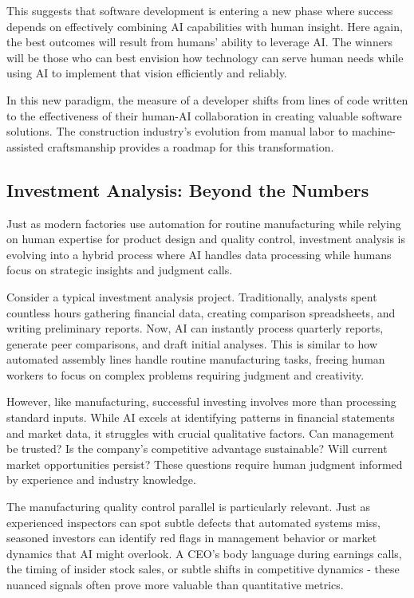\documentclass[
  Letterpaper,
]{scrbook}
\begin{document}
This suggests that software development is entering a new phase where
success depends on effectively combining AI capabilities with human
insight. Here again, the best outcomes will result from humans' ability
to leverage AI. The winners will be those who can best envision how
technology can serve human needs while using AI to implement that vision
efficiently and reliably.

In this new paradigm, the measure of a developer shifts from lines of
code written to the effectiveness of their human-AI collaboration in
creating valuable software solutions. The construction industry's
evolution from manual labor to machine-assisted craftsmanship provides a
roadmap for this transformation.

\subsection{Investment Analysis: Beyond the
Numbers}\label{investment-analysis-beyond-the-numbers}

Just as modern factories use automation for routine manufacturing while
relying on human expertise for product design and quality control,
investment analysis is evolving into a hybrid process where AI handles
data processing while humans focus on strategic insights and judgment
calls.

Consider a typical investment analysis project. Traditionally, analysts
spent countless hours gathering financial data, creating comparison
spreadsheets, and writing preliminary reports. Now, AI can instantly
process quarterly reports, generate peer comparisons, and draft initial
analyses. This is similar to how automated assembly lines handle routine
manufacturing tasks, freeing human workers to focus on complex problems
requiring judgment and creativity.

However, like manufacturing, successful investing involves more than
processing standard inputs. While AI excels at identifying patterns in
financial statements and market data, it struggles with crucial
qualitative factors. Can management be trusted? Is the company's
competitive advantage sustainable? Will current market opportunities
persist? These questions require human judgment informed by experience
and industry knowledge.

The manufacturing quality control parallel is particularly relevant.
Just as experienced inspectors can spot subtle defects that automated
systems miss, seasoned investors can identify red flags in management
behavior or market dynamics that AI might overlook. A CEO's body
language during earnings calls, the timing of insider stock sales, or
subtle shifts in competitive dynamics - these nuanced signals often
prove more valuable than quantitative metrics.
\end{document}
